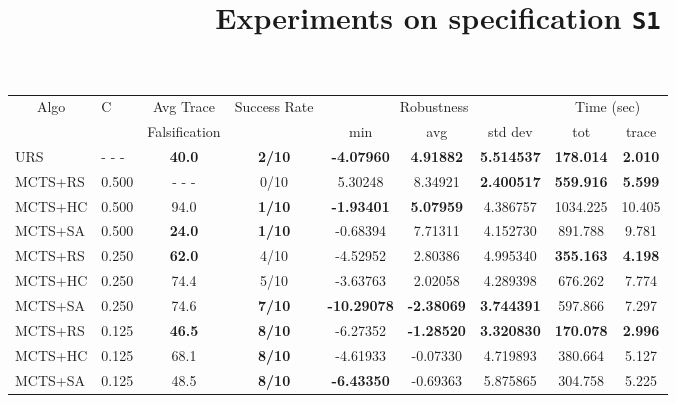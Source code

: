 \documentclass[12pt]{article}
\begin{document}
\begin{table}[ht]
\centering
\title{Experiments on specification \texttt{S1}}
\begin{tabular}{|l|l|c|c|c|c|c|c|c|}
\hline
\multicolumn{1}{|c|}{\multirow{2}{*}{Algo}} & \multirow{2}{*}{C} & Avg Trace               & \multirow{2}{*}{Success Rate} & \multicolumn{3}{c|}{Robustness} & \multicolumn{2}{c|}{Time (sec)} \\ \cline{5-9} 
\multicolumn{1}{|c|}{}                      &                    & Falsification           &                               & min       & avg      & std dev  & tot        & trace        \\ \hline
URS                                         & - - -              & \textbf{40.0}           & \textbf{2/10}                 & \textbf{-4.07960}    & \textbf{4.91882}
                                            & \textbf{5.514537}  & \textbf{178.014}        & \textbf{2.010}    \\ \hline
MCTS+RS                                     & 0.500              & - - -                   & 0/10                          &  5.30248  & 8.34921  & \textbf{2.400517} &  \textbf{559.916} &  \textbf{5.599}    \\
MCTS+HC                                     & 0.500              &  94.0                   & \textbf{1/10}                 & \textbf{-1.93401}  & \textbf{5.07959} & 4.386757 & 1034.225 & 10.405    \\
MCTS+SA                                     & 0.500              &  \textbf{24.0}          & \textbf{1/10}                 & -0.68394           & 7.71311          & 4.152730 &  891.788 &  9.781    \\ \hline

MCTS+RS                                     & 0.250              &  \textbf{62.0}          & 4/10                          & -4.52952  &  2.80386 & 4.995340 &  \textbf{355.163} &  \textbf{4.198}    \\
MCTS+HC                                     & 0.250              &  74.4                   & 5/10                          & -3.63763  &  2.02058 & 4.289398 &  676.262 &  7.774    \\
MCTS+SA                                     & 0.250              &  74.6                   & \textbf{7/10}                          & \textbf{-10.29078} & \textbf{-2.38069} & \textbf{3.744391} &  597.866 &  7.297    \\ \hline

MCTS+RS                                     & 0.125              &  \textbf{46.5}          & \textbf{8/10}                          & -6.27352  & \textbf{-1.28520} & \textbf{3.320830} &  \textbf{170.078} &  \textbf{2.996}    \\
MCTS+HC                                     & 0.125              &  68.1                   & \textbf{8/10}                         & -4.61933  & -0.07330 & 4.719893 &  380.664 &  5.127    \\
MCTS+SA                                     & 0.125              &  48.5                   & \textbf{8/10}                         & \textbf{-6.43350}  & -0.69363 & 5.875865 &  304.758 &  5.225    \\ \hline


\end{tabular}
\end{table}
\end{document}
